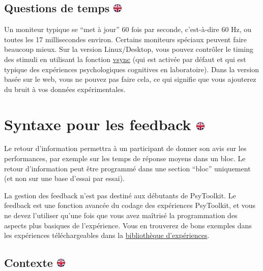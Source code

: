 \documentclass[
]{book}
\begin{document}
\hypertarget{questions-de-temps}{%
\subsection[Questions de temps ]{\texorpdfstring{Questions de temps \href{https://www.psytoolkit.org/doc3.1.0/stimuli.html\#_timing_issues}{\protect\includegraphics{img/ukflag.png}}}{Questions de temps }}\label{questions-de-temps}}

Un moniteur typique se ``met à jour'' 60 fois par seconde, c'est-à-dire 60 Hz, ou toutes les 17 millisecondes environ. Certains moniteurs spéciaux peuvent faire beaucoup mieux. Sur la version Linux/Desktop, vous pouvez contrôler le timing des stimuli en utilisant la fonction \protect\hyperlink{vsync}{vsync} (qui est activée par défaut et qui est typique des expériences psychologiques cognitives en laboratoire). Dans la version basée sur le web, vous ne pouvez pas faire cela, ce qui signifie que vous ajouterez du bruit à vos données expérimentales.

\hypertarget{syntaxe-pour-les-feedback}{%
\section[Syntaxe pour les feedback ]{\texorpdfstring{Syntaxe pour les feedback \href{https://www.psytoolkit.org/doc3.1.0/feedback.html}{\protect\includegraphics{img/ukflag.png}}}{Syntaxe pour les feedback }}\label{syntaxe-pour-les-feedback}}

Le retour d'information permettra à un participant de donner son avis sur les performances, par exemple sur les temps de réponse moyens dans un bloc. Le retour d'information peut être programmé dans une section ``bloc'' uniquement (et non sur une base d'essai par essai).

La gestion des feedback n'est pas destiné aux débutants de PsyToolkit. Le feedback est une fonction avancée du codage des expériences PsyToolkit, et vous ne devez l'utiliser qu'une fois que vous avez maîtrisé la programmation des aspects plus basiques de l'expérience. Vous en trouverez de bons exemples dans les expériences téléchargeables dans la \href{http://www.psytoolkit.org/experiment-library/}{bibliothèque d'expériences}.

\hypertarget{contexte}{%
\subsection[Contexte ]{\texorpdfstring{Contexte \href{https://www.psytoolkit.org/doc3.1.0/feedback.html\#_background}{\protect\includegraphics{img/ukflag.png}}}{Contexte }}\label{contexte}}
\end{document}

